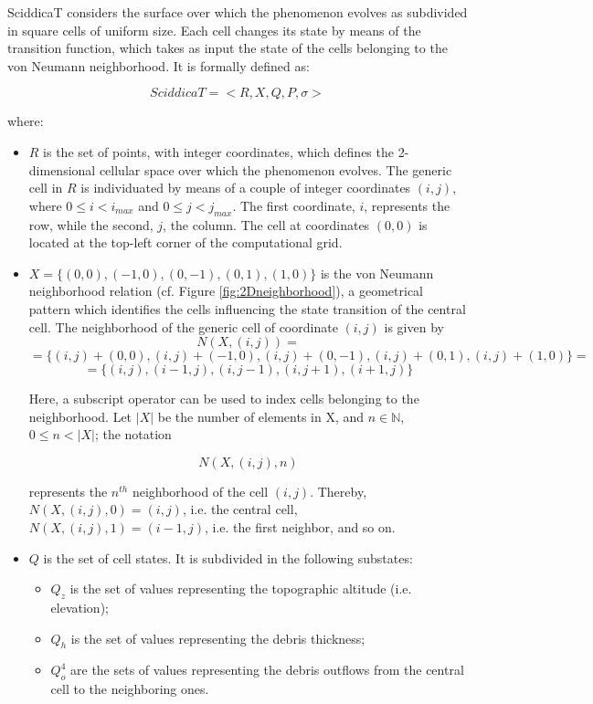 SciddicaT considers the surface over which the phenomenon evolves as
subdivided in square cells of uniform size. Each cell changes its
state by means of the transition function, which takes as input the
state of the cells belonging to the von Neumann neighborhood. It is
formally defined as:

$$SciddicaT = < R, X, Q , P, \sigma  >$$

where:

\begin{itemize}

\item $R$ is the set of points, with integer coordinates, which
  defines the 2-dimensional cellular space over which the phenomenon
  evolves. The generic cell in $R$ is individuated by means of a
  couple of integer coordinates $(i, j)$, where $0 \leq i < i_{max}$
  and $0 \leq j < j_{max}$. The first coordinate, $i$, represents the
  row, while the second, $j$, the column. The cell at coordinates
  $(0,0)$ is located at the top-left corner of the computational grid.

\item $X = \{(0,0), (-1, 0), (0, -1), (0, 1), (1, 0)\}$ is the von
  Neumann neighborhood relation (cf. Figure \ref{fig:2Dneighborhood}), a
  geometrical pattern which identifies the cells influencing the state
  transition of the central cell. The neighborhood of the generic cell
  of coordinate $(i, j)$ is given by
$$N(X, (i, j)) =$$
$$= \{(i, j)+(0,0), (i, j)+(-1, 0), (i, j)+(0, -1),
(i, j)+(0, 1), (i, j)+(1, 0)\} =$$
$$= \{(i, j), (i-1, j), (i, j-1), (i, j+1), (i+1, j)\}$$

Here, a subscript operator can be used to index cells belonging to the
neighborhood. Let $|X|$ be the number of elements in X, and $n \in
\mathbb{N}$, $0 \leq n < |X|$; the notation

$$N(X, (i, j), n)$$

represents the $n^{th}$ neighborhood of the cell $(i,j)$. Thereby, $N(X, (i, j), 0) = (i, j)$, i.e. the central cell, $N(X, (i, j), 1) = (i-1, j)$, i.e. the first neighbor, and so on.

\item $Q$ is the set of cell states. It is subdivided in the following
  substates:

\begin{itemize}
    \item   $Q_z$ is the set of values representing the topographic altitude (i.e. elevation);
    \item   $Q_h$ is the set of values representing the debris thickness;
    \item   $Q_o^4$ are the sets of values representing the debris outflows from the central cell to the neighboring ones.
\end{itemize}


\end{itemize}
